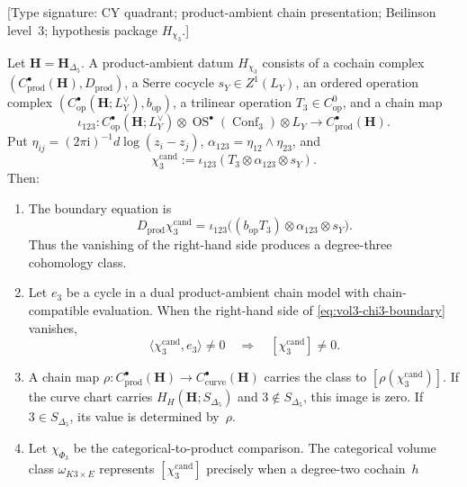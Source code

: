 \begin{theorem}
\label{thm:hoch-chi3-koszul-obstruction}
\textup{[Type signature: CY quadrant; product-ambient chain
presentation; Beilinson level~$3$; hypothesis package
$H_{\chi_3}$.]}

Let $\mathbf H=\mathbf H_{\Delta_5}$.  A product-ambient datum
$H_{\chi_3}$ consists of a cochain complex
$(C^\bullet_{\mathrm{prod}}(\mathbf H),D_{\mathrm{prod}})$, a Serre
cocycle $s_Y\in Z^1(L_Y)$, an ordered operation complex
$(C^\bullet_{\mathrm{op}}(\mathbf H;L_Y^\vee),b_{\mathrm{op}})$, a
trilinear operation $T_3\in C^0_{\mathrm{op}}$, and a chain map
\[
 \iota_{123}\colon
 C^\bullet_{\mathrm{op}}(\mathbf H;L_Y^\vee)
 \otimes\operatorname{OS}^\bullet(\operatorname{Conf}_3)
 \otimes L_Y
 \longrightarrow C^\bullet_{\mathrm{prod}}(\mathbf H).
\]
Put $\eta_{ij}=(2\pi\mathrm i)^{-1}d\log(z_i-z_j)$,
$\alpha_{123}=\eta_{12}\wedge\eta_{23}$, and
\begin{equation}
\label{eq:vol3-chi3-candidate}
 \chi_3^{\mathrm{cand}}
 :=\iota_{123}(T_3\otimes\alpha_{123}\otimes s_Y).
\end{equation}
Then:
\begin{enumerate}[label=\textup{(\roman*)}]
\item The boundary equation is
\begin{equation}
\label{eq:vol3-chi3-boundary}
 D_{\mathrm{prod}}\chi_3^{\mathrm{cand}}
 =\iota_{123}
 \bigl((b_{\mathrm{op}}T_3)\otimes\alpha_{123}\otimes s_Y\bigr).
\end{equation}
Thus the vanishing of the right-hand side produces a degree-three
cohomology class.
\item Let $e_3$ be a cycle in a dual product-ambient chain model with
chain-compatible evaluation.  When the right-hand side of
\eqref{eq:vol3-chi3-boundary} vanishes,
\[
 \langle\chi_3^{\mathrm{cand}},e_3\rangle\neq0
 \quad\Longrightarrow\quad
 [\chi_3^{\mathrm{cand}}]\neq0.
\]
\item A chain map
$\rho\colon C^\bullet_{\mathrm{prod}}(\mathbf H)\to
C^\bullet_{\mathrm{curve}}(\mathbf H)$ carries the class to
$[\rho(\chi_3^{\mathrm{cand}})]$.  If the curve chart carries
$H_H(\mathbf H;S_{\Delta_5})$ and $3\notin S_{\Delta_5}$, this image
is zero.  If $3\in S_{\Delta_5}$, its value is determined by~$\rho$.
\item Let $\chi_{\Phi_3}$ be the categorical-to-product comparison.
The categorical volume class $\omega_{K3\times E}$ represents
$[\chi_3^{\mathrm{cand}}]$ precisely when a degree-two cochain~$h$

\end{enumerate}
\end{theorem}
